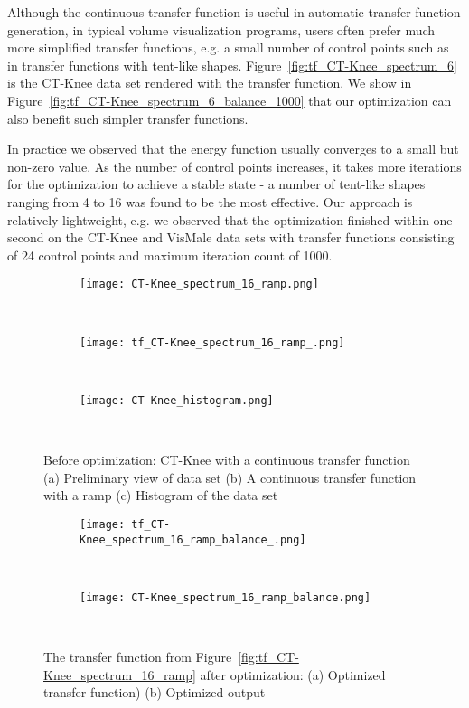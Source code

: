 Although the continuous transfer function is useful in automatic transfer function generation, in typical volume visualization programs, users often prefer much more simplified transfer functions, e.g. a small number of control points such as in transfer functions with tent-like shapes. Figure~\ref{fig:tf_CT-Knee_spectrum_6} is the CT-Knee data set rendered with the transfer function. We show in Figure~\ref{fig:tf_CT-Knee_spectrum_6_balance_1000} that our optimization can also benefit such simpler transfer functions.

In practice we observed that the energy function usually converges to a small but non-zero value. As the number of control points increases, it takes more iterations for the optimization to achieve a stable state - a number of tent-like shapes ranging from 4 to 16 was found to be the most effective.
Our approach is relatively lightweight, e.g. we observed that the optimization finished within one second on the CT-Knee and VisMale data sets with transfer functions consisting of 24 control points and maximum iteration count of 1000.

\begin{figure}
\centering

\begin{subfigure}{0.15\textwidth}
\texttt{[image: CT-Knee\_spectrum\_16\_ramp.png]}
\caption{~}
\end{subfigure}
\begin{subfigure}{0.15\textwidth}
\texttt{[image: tf\_CT-Knee\_spectrum\_16\_ramp\_.png]}
\caption{~}
\label{fig:tf_CT-Knee_spectrum_16_ramp_}
\end{subfigure}
\begin{subfigure}{0.15\textwidth}
\texttt{[image: CT-Knee\_histogram.png]}
\caption{~}
\label{fig:CT-Knee_histogram}
\end{subfigure}
\caption{Before optimization: CT-Knee with a continuous transfer 
function (a) Preliminary view of data set (b) A continuous transfer 
function with a ramp (c) Histogram of the data set}
\label{fig:tf_CT-Knee_spectrum_16_ramp}

\begin{subfigure}{0.15\textwidth}
\texttt{[image: tf\_CT-Knee\_spectrum\_16\_ramp\_balance\_.png]}
\caption{~}
\end{subfigure}
\begin{subfigure}{0.15\textwidth}
\texttt{[image: CT-Knee\_spectrum\_16\_ramp\_balance.png]}    
\caption{~}
\end{subfigure}
\caption{The transfer function from Figure~\ref{fig:tf_CT-Knee_spectrum_16_ramp} after optimization: (a) Optimized transfer function) (b) Optimized output}
\label{fig:tf_CT-Knee_spectrum_16_ramp_balance}

\end{figure}

